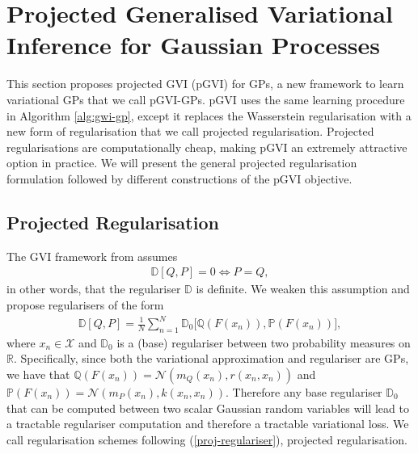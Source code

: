 \documentclass{article}
\numberwithin{equation}{section}
\begin{document}
\newpage
\section{Projected Generalised Variational Inference for Gaussian Processes}\label{section:pgvi}
This section proposes projected GVI (pGVI) for GPs, a new framework to learn variational GPs that we call pGVI-GPs.
pGVI uses the same learning procedure in Algorithm \ref{alg:gwi-gp}, except it replaces the Wasserstein regularisation with a new form of regularisation that we call projected regularisation.
Projected regularisations are computationally cheap, making pGVI an extremely attractive option in practice.
We will present the general projected regularisation formulation followed by different constructions of the pGVI objective.

\subsection{Projected Regularisation}
The GVI framework from \cite{knoblauch2022optimization} assumes
\begin{align}
    \mathbb{D}\left[Q, P\right] = 0 \Leftrightarrow P = Q,
\end{align}
in other words, that the regulariser $\mathbb{D}$ is definite.
We weaken this assumption and propose regularisers of the form
\begin{align}
    \mathbb{D}\left[Q, P\right] = \frac{1}{N}\sum_{{n}=1}^{N} \mathbb{D}_0 \Big[\mathbb{Q}\left(F(x_n)\right), \mathbb{P}\left(F(x_n)\right)\Big],
    \label{proj-regulariser}
\end{align}
where $x_n \in \mathcal{X}$ and $\mathbb{D}_0$ is a (base) regulariser between two probability measures on $\mathbb{R}$.
Specifically, since both the variational approximation and regulariser are GPs, we have that $\mathbb{Q}\left(F(x_n)\right) = \mathcal{N}\left(m_Q(x_n), r(x_n, x_n)\right)$ and $\mathbb{P}\left(F(x_n)\right) = \mathcal{N}\left(m_P(x_n), k(x_n, x_n)\right)$.
Therefore any base regulariser $\mathbb{D}_0$ that can be computed between two scalar Gaussian random variables will lead to a tractable regulariser computation and therefore a tractable variational loss. We call regularisation schemes following (\ref{proj-regulariser}), projected regularisation.
\end{document}

